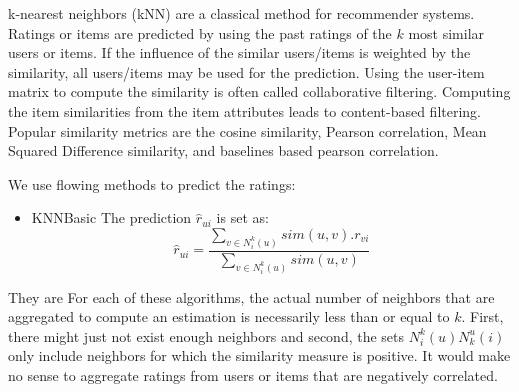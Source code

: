 
k-nearest neighbors (kNN) are a classical method for recommender systems. Ratings or items are predicted by using the past ratings of the $k$ most similar users or items. If the influence of the similar users/items is weighted by the similarity, all users/items may be used for the prediction. Using the user-item matrix to compute the similarity is often called collaborative filtering. Computing the item similarities from the item attributes leads to content-based filtering. Popular similarity metrics are the cosine similarity, Pearson correlation, Mean Squared Difference similarity, and baselines based pearson correlation. 


We use flowing methods to predict the ratings: 
\begin{itemize}
\item KNNBasic
The prediction $\hat{r}_{ui}$ is set as:
$$\hat{r}_{ui}=\frac{\sum_{v \in N_i^k(u)} sim(u,v).r_{vi}}{\sum_{v \in N_i^k(u)} sim(u,v)}$$
\end{itemize}
They are For each of these algorithms, the actual number of neighbors that are aggregated to compute an estimation is necessarily less than or equal to $k$. First, there might just not exist enough neighbors and second, the sets $N_i^k(u) N_k^u(i)$ only include neighbors for which the similarity measure is positive. It would make no sense to aggregate ratings from users or items that are negatively correlated. 